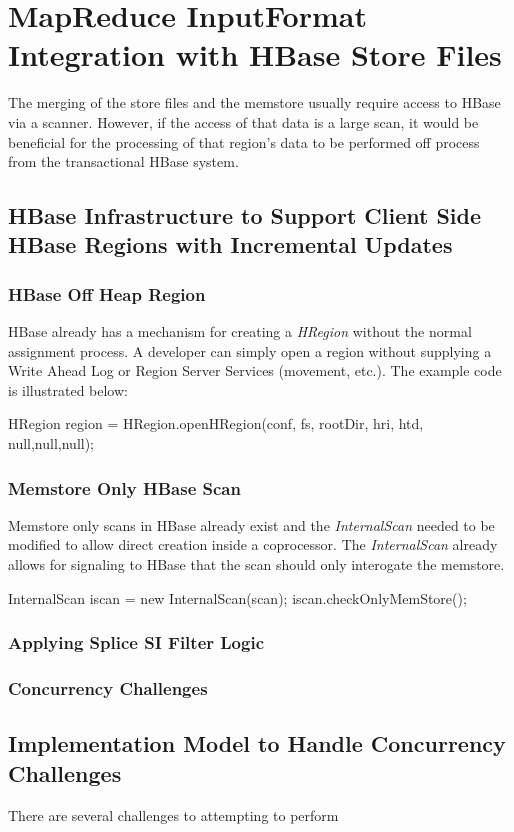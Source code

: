 \section{MapReduce InputFormat Integration with HBase Store Files} The merging
of the store files and the memstore usually require access to HBase via a scanner.  However, if the access of that data is
a large scan, it would be beneficial for the processing of that region's data to
be performed off process from the transactional HBase system.

\subsection{HBase Infrastructure to Support Client Side HBase
Regions with Incremental Updates}  

\subsubsection{HBase Off Heap Region}
HBase already has a mechanism for creating a \emph{HRegion} without the normal
assignment process.  A developer can simply open a region without supplying a
Write Ahead Log or Region Server Services (movement, etc.).  The example code is
illustrated below:

		HRegion region = HRegion.openHRegion(conf, fs, rootDir, hri, htd, null,null,null);

\subsubsection{Memstore Only HBase Scan}
Memstore only scans in HBase already exist and the \emph{InternalScan} needed to
be modified to allow direct creation inside a coprocessor.  The
\emph{InternalScan} already allows for signaling to HBase that the scan should
only interogate the memstore.

			InternalScan iscan = new InternalScan(scan);
			iscan.checkOnlyMemStore();

\subsubsection{Applying Splice SI Filter Logic}


\subsubsection{Concurrency Challenges}

\subsection{Implementation Model to Handle Concurrency Challenges}  There are
several challenges to attempting to perform


